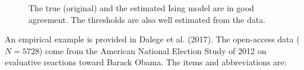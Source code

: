 \documentclass[
  a4paper,
  DIV=11,
  numbers=noendperiod,
  oneside]{scrreprt}
\newenvironment{Shaded}{}{}
\newcommand{\AttributeTok}[1]{\textcolor[rgb]{0.84,0.23,0.29}{#1}}
\newcommand{\ConstantTok}[1]{\textcolor[rgb]{0.00,0.36,0.77}{#1}}
\newcommand{\DecValTok}[1]{\textcolor[rgb]{0.00,0.36,0.77}{#1}}
\newcommand{\FloatTok}[1]{\textcolor[rgb]{0.00,0.36,0.77}{#1}}
\newcommand{\FunctionTok}[1]{\textcolor[rgb]{0.44,0.26,0.76}{#1}}
\newcommand{\NormalTok}[1]{\textcolor[rgb]{0.14,0.16,0.18}{#1}}
\newcommand{\SpecialCharTok}[1]{\textcolor[rgb]{0.00,0.36,0.77}{#1}}
\newcommand{\StringTok}[1]{\textcolor[rgb]{0.01,0.18,0.38}{#1}}
\begin{document}
\begin{Shaded}
\end{Shaded}

\begin{figure}


\caption{\label{fig-ch6-img18-old-87}The true (original) and the
estimated Ising model are in good agreement. The thresholds are also
well estimated from the data.}

\end{figure}%

An empirical example is provided in Dalege et al. (2017). The
open-access data (\(N = 5728\)) come from the American National Election
Study of 2012 on evaluative reactions toward Barack Obama. The items and
abbreviations are:
\end{document}

